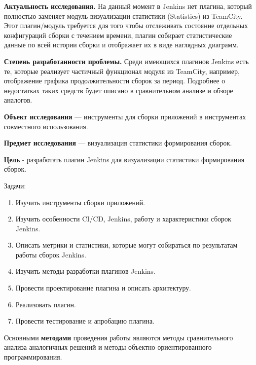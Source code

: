 \textbf{Актуальность исследования.} На данный момент в Jenkins нет плагина, который полностью заменяет модуль визуализации статистики (Statistics) из TeamCity. Этот плагин/модуль требуется для того чтобы отслеживать состояние отдельных конфигураций сборки с течением времени, плагин собирает статистические данные по всей истории сборки и отображает их в виде наглядных диаграмм.

\textbf{Степень разработанности проблемы.} Среди имеющихся плагинов Jenkins есть те, которые реализует частичный функционал модуля из TeamCity, например, отображение графика продолжительности сборок за период. Подробнее о недостатках таких средств будет описано в сравнительном анализе и обзоре аналогов. 


\textbf{Объект исследования} — инструменты для сборки приложений в инструментах совместного использования.

\textbf{Предмет исследования} — визуализация статистики формирования сборок.

\textbf{Цель} - разработать плагин Jenkins для визуализации статистики формирования сборок. %

Задачи:
 
\begin{enumerate}
	\item Изучить инструменты сборки приложений.
	
	\item Изучить особенности CI/CD, Jenkins, работу и характеристики сборок Jenkins.
	
	\item Описать метрики и статистики, которые могут собираться по результатам работы сборок Jenkins.
	
	\item Изучить методы разработки плагинов Jenkins.
	
	\item Провести проектирование плагина и описать архитектуру.
	
	\item Реализовать плагин.
	
	\item Провести тестирование и апробацию плагина. 
	
\end{enumerate}

Основными \textbf{методами} проведения работы являются методы сравнительного анализа аналогичных решений и методы объектно-ориентированного программирования.





